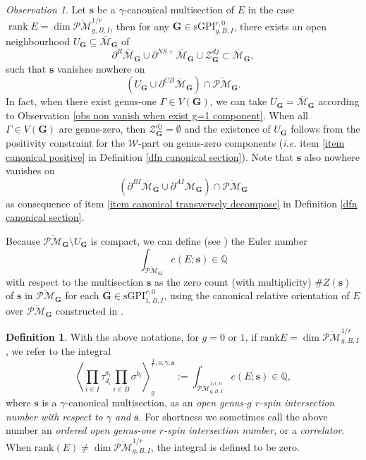 \documentclass[11pt]{amsart}
\theoremstyle{definition}
\newtheorem{dfn}[dummy]{Definition}
\theoremstyle{remark}
\newtheorem{obs}[dummy]{Observation}
\newcommand{\oPMb}{{\overline{\mathcal{PM}}}}
\newcommand{\<}{\left<}
\renewcommand{\>}{\right>}
\numberwithin{equation}{section}
\DeclareMathOperator{\rk}{rank}
\def\Mbar{{\overline{\mathcal M}}}
\def\sGPI{\text{sGPI}}
\begin{document}
\begin{obs}\label{obs non vanish of section near boundary}
     Let $\bm{s}$ be a $\gamma$-canonical multisection of $E$ in the case $\rk E=\dim\oPMb_{g,B,I}^{1/r}$, then for any $\bm{G}\in \sGPI^{r,0}_{g,B,I}$, there exists an open neighbourhood $U_{\bm{G}}\subseteq \Mbar_{\bm{G}}$ of 
     $$\partial^{R}\Mbar_{\bm{G}}\cup \partial^{NS+}\Mbar_{\bm{G}}\cup \mathcal Z^{dj}_{\bm{G}}\subset \Mbar_{\bm{G}},$$ 
     such that $\bm{s}$ vanishes nowhere on 
     $$
     (U_{\bm{G}} \cup \partial^{CB}\Mbar_{\bm{G}})\cap \oPMb_{\bm{G}}.
     $$
     In fact, when there exist genus-one $\Gamma \in V(\bm{G})$, we can take $U_{\bm{G}}=\Mbar_{\bm{G}}$ according to Observation \ref{obs non vanish when exist g=1 component}. When all $\Gamma \in V(\bm{G})$ are genus-zero, then $\mathcal Z^{dj}_{\bm{G}}=\emptyset$ and the existence of $U_{\bm{G}}$ follows from the positivity constraint for the $\mathcal W$-part on genus-zero components (\textit{i.e.} item \ref{item canonical positive} in Definition \ref{dfn canonical section}).  Note that $\bm{s}$ also nowhere vanishes on
     $$( \partial^{BI}\Mbar_{\bm{G}}\cup \partial^{AI}\Mbar_{\bm{G}})\cap \oPMb_{\bm{G}}$$
     as consequence of item \ref{item canonical transversely decompose} in Definition \ref{dfn canonical section}. 
\end{obs}

Because $\oPMb_{\bm{G}}\setminus U_{\bm{G}}$ is compact, we can define (see \cite[Appendix A]{BCT2}) the Euler number
$$\int_{\oPMb_{\bm{G}}}e(E ; \mathbf{s})\in\mathbb{Q}$$
with respect to the multisection $\bm{s}$  as the zero count (with multiplicity) $\# Z(\bm{s})$ of $\bm{s}$ in $\oPMb_{\bm{G}}$ for each $\bm{G}\in \sGPI^{r,0}_{1,B,I}$, using the canonical relative orientation of $E$ over $\oPMb_{\bm{G}}$ constructed in \cite{TZ1}.

\begin{dfn}\label{dfn correlator}
With the above notations, for $g=0$ or $1$, if $\text{rank} E=\dim\oPMb_{g,B,I}^{1/r}$, we refer to the integral 
\[
\left\langle \prod_{i\in I}\tau^{a_i}_{d_i}\prod_{i \in B}\sigma^{b_i}\right\rangle^{\frac{1}{r},o,\gamma,\mathbf{s}}_g := \int_{\oPMb^{1/r,0}_{g,B,I}}e(E ; \mathbf{s})\in\mathbb{Q}, 
\]
where $\mathbf{s}$ is a $\gamma$-canonical multisection, 
as an \emph{open genus-$g$ $r$-spin intersection number with respect to $\gamma$ and $\bm{s}$}. For shortness we sometimes call the above number an \emph{ordered open genus-one $r$-spin intersection number}, or a \emph{correlator}. When $\text{rank}(E)\neq\dim\oPMb_{g,B,I}^{1/r}$, the integral is defined to be zero. 
\end{dfn}
\end{document}
